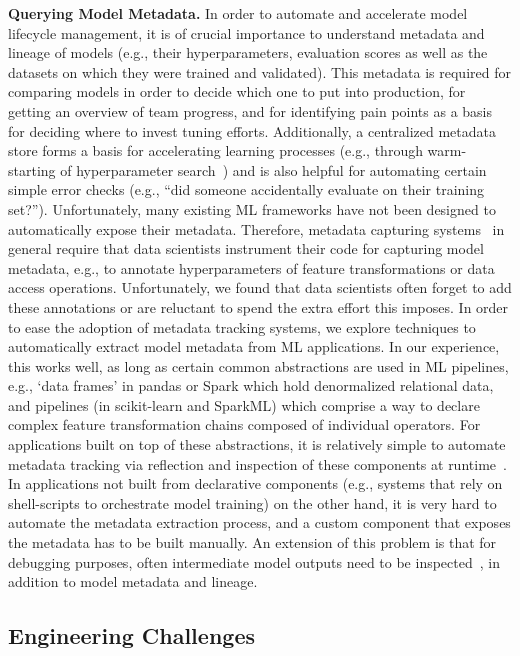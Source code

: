 \documentclass[11pt]{article}
\newcommand{\hdr}[1]{\noindent\textbf{#1.}}
\begin{document}
\hdr{Querying Model Metadata} In order to automate and accelerate model lifecycle management, it is of crucial importance to understand metadata and lineage of models (e.g., their hyperparameters, evaluation scores as well as the datasets on which they were trained and validated). This metadata is required for comparing models in order to decide which one to put into production, for getting an overview of team progress, and for identifying pain points as a basis for deciding where to invest tuning efforts. Additionally, a centralized metadata store forms a basis for accelerating learning processes (e.g., through warm-starting of hyperparameter search~\cite{Feurer2015}) and is also helpful for automating certain simple error checks (e.g., ``did someone accidentally evaluate on their training set?''). Unfortunately, many existing ML frameworks have not been designed to automatically expose their metadata. Therefore, metadata capturing systems~\cite{Vanschoren2014,Vartak2016,Schelter2017} in general require that data scientists instrument their code for capturing model metadata, e.g., to annotate hyperparameters of feature transformations or data access operations.  Unfortunately, we found that data scientists often forget to add these annotations or are reluctant to spend the extra effort this imposes. In order to ease the adoption of metadata tracking systems, we explore techniques to automatically extract model metadata from ML applications. In our experience, this works well, as long as certain common abstractions are used in ML pipelines, e.g., `data frames' in pandas or Spark which hold denormalized relational data, and pipelines (in scikit-learn and SparkML) which comprise a way to declare complex feature transformation chains composed of individual operators. For applications built on top of these abstractions, it is relatively simple to automate metadata tracking via reflection and inspection of these components at runtime~\cite{Schelter2017}. In applications not built from declarative components (e.g., systems that rely on shell-scripts to orchestrate model training) on the other hand, it is very hard to automate the metadata extraction process, and a custom component that exposes the metadata has to be built manually. An extension of this problem is that for debugging purposes, often intermediate model outputs need to be inspected~\cite{Zhang2017,Vartak2018}, in addition to model metadata and lineage.

\subsection{Engineering Challenges}
\label{sec:engineering}
\end{document}
